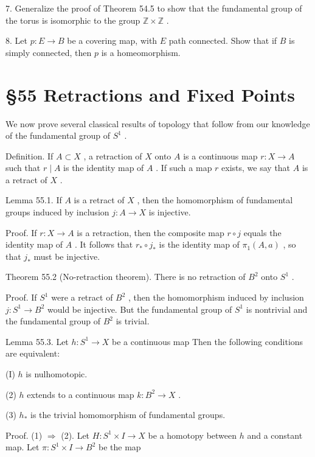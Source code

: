 7. Generalize the proof of Theorem 54.5 to show that the fundamental group of the torus is isomorphic to the group \(\mathbb{Z} \times  \mathbb{Z}\) .

8. Let \(p : E \rightarrow  B\) be a covering map, with \(E\) path connected. Show that if \(B\) is simply connected, then \(p\) is a homeomorphism.

\section*{§55 Retractions and Fixed Points}

We now prove several classical results of topology that follow from our knowledge of the fundamental group of \({S}^{1}\) .

Definition. If \(A \subset  X\) , a retraction of \(X\) onto \(A\) is a continuous map \(r : X \rightarrow  A\) such that \(r \mid  A\) is the identity map of \(A\) . If such a map \(r\) exists, we say that \(A\) is a retract of \(X\) .

Lemma 55.1. If \(A\) is a retract of \(X\) , then the homomorphism of fundamental groups induced by inclusion \(j : A \rightarrow  X\) is injective.

Proof. If \(r : X \rightarrow  A\) is a retraction, then the composite map \(r \circ  j\) equals the identity map of \(A\) . It follows that \({r}_{ * } \circ  {j}_{ * }\) is the identity map of \({\pi }_{1}\left( {A,a}\right)\) , so that \({j}_{ * }\) must be injective.

Theorem 55.2 (No-retraction theorem). There is no retraction of \({B}^{2}\) onto \({S}^{1}\) .

Proof. If \({S}^{1}\) were a retract of \({B}^{2}\) , then the homomorphism induced by inclusion \(j : {S}^{1} \rightarrow  {B}^{2}\) would be injective. But the fundamental group of \({S}^{1}\) is nontrivial and the fundamental group of \({B}^{2}\) is trivial.

Lemma 55.3. Let \(h : {S}^{1} \rightarrow  X\) be a continuous map Then the following conditions are equivalent:

(I) \(h\) is nulhomotopic.

(2) \(h\) extends to a continuous map \(k : {B}^{2} \rightarrow  X\) .

(3) \({h}_{ * }\) is the trivial homomorphism of fundamental groups.

Proof. (1) \(\Rightarrow\) (2). Let \(H : {S}^{1} \times  I \rightarrow  X\) be a homotopy between \(h\) and a constant map. Let \(\pi  : {S}^{1} \times  I \rightarrow  {B}^{2}\) be the map

